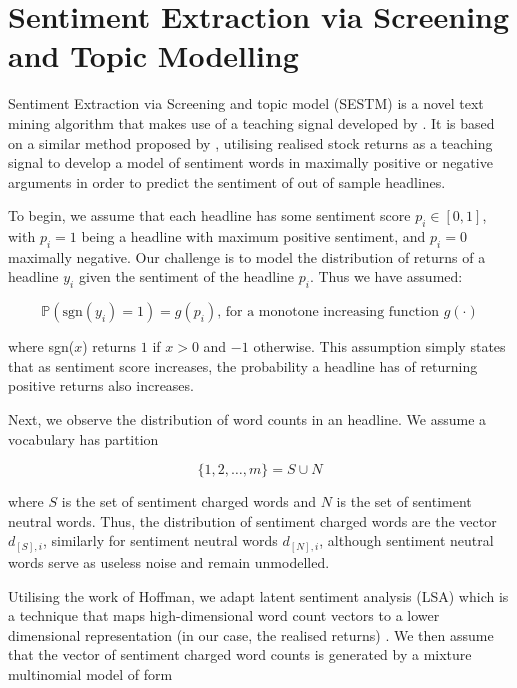\section{Sentiment Extraction via Screening and Topic Modelling}
Sentiment Extraction via Screening and topic model (SESTM) is a novel text mining algorithm that makes use of a teaching signal developed by \textcite{sestm}. It is based on a similar method proposed by \textcite{jegadeesh2013word}, utilising realised stock returns as a teaching signal to develop a model of sentiment words in maximally positive or negative arguments in order to predict the sentiment of out of sample headlines.

To begin, we assume that each headline has some sentiment score $p_i \in [0,1]$, with $p_i = 1$ being a headline with maximum positive sentiment, and $p_i = 0$ maximally negative. Our challenge is to model the distribution of returns of a headline $y_i$ given the sentiment of the headline $p_i$. Thus we have assumed:

\begin{equation}
\mathbb{P}(\text{sgn}(y_i) = 1) = g(p_i) \text{, for a monotone increasing function } g(\cdot)
\end{equation}

\noindent
where sgn($x$) returns $1$ if $x > 0$ and $-1$ otherwise. This assumption simply states that as sentiment score increases, the probability a headline has of returning positive returns also increases.

Next, we observe the distribution of word counts in an headline. We assume a vocabulary has partition

\begin{equation}
\{1,2,\dots,m\} = S \cup N
\end{equation}

\noindent
where $S$ is the set of sentiment charged words and $N$ is the set of sentiment neutral words. Thus, the distribution of sentiment charged words are the vector $d_{[S],i}$, similarly for sentiment neutral words $d_{[N],i}$, although sentiment neutral words serve as useless noise and remain unmodelled.

Utilising the work of Hoffman, we adapt latent sentiment analysis (LSA) which is a technique that maps high-dimensional word count vectors to a lower dimensional representation (in our case, the realised returns) \parencite{lsa}. We then assume that the vector of sentiment charged word counts is generated by a mixture multinomial model of form

